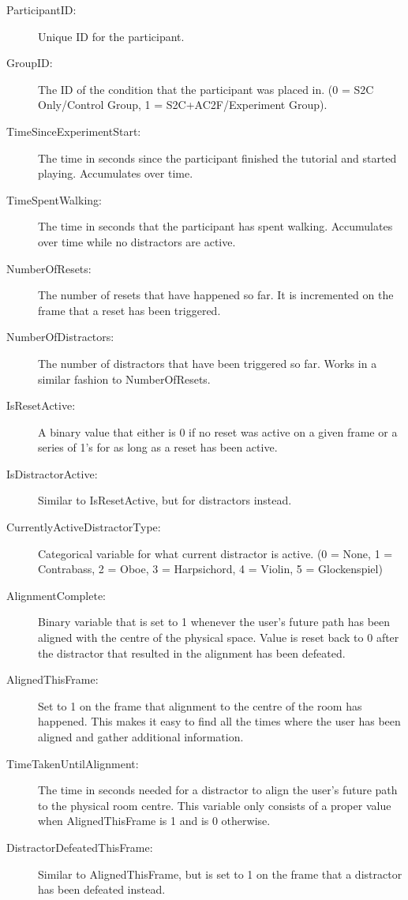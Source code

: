 \begin{description}
   \item[ParticipantID:] Unique ID for the participant.
   \item[GroupID:] The ID of the condition that the participant was placed in. (0 = S2C Only/Control Group, 1 = S2C+AC2F/Experiment Group).
   \item[TimeSinceExperimentStart:] The time in seconds since the participant finished the tutorial and started playing. Accumulates over time. 
   \item[TimeSpentWalking:] The time in seconds that the participant has spent walking. Accumulates over time while no distractors are active. 
   \item[NumberOfResets:] The number of resets that have happened so far. It is incremented on the frame that a reset has been triggered. 
   \item[NumberOfDistractors:] The number of distractors that have been triggered so far. Works in a similar fashion to NumberOfResets.
   \item[IsResetActive:] A binary value that either is 0 if no reset was active on a given frame or a series of 1's for as long as a reset has been active. 
   \item[IsDistractorActive:] Similar to IsResetActive, but for distractors instead.
   \item[CurrentlyActiveDistractorType:] Categorical variable for what current distractor is active. (0 = None, 1 = Contrabass, 2 = Oboe, 3 = Harpsichord, 4 = Violin, 5 = Glockenspiel)
   \item[AlignmentComplete:] Binary variable that is set to 1 whenever the user's future path has been aligned with the centre of the physical space. Value is reset back to 0 after the distractor that resulted in the alignment has been defeated. 
   \item[AlignedThisFrame:] Set to 1 on the frame that alignment to the centre of the room has happened. This makes it easy to find all the times where the user has been aligned and gather additional information.
   \item[TimeTakenUntilAlignment:] The time in seconds needed for a distractor to align the user's future path to the physical room centre. This variable only consists of a proper value when AlignedThisFrame is 1 and is 0 otherwise. 
   \item[DistractorDefeatedThisFrame:] Similar to AlignedThisFrame, but is set to 1 on the frame that a distractor has been defeated instead. 

\end{description}
